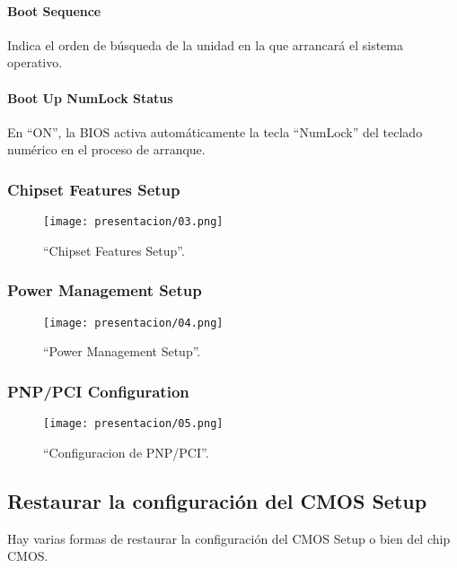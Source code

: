 \documentclass[12pt,oneside,a4paper]{article}
\begin{document}
			\paragraph{Boot Sequence}
			Indica el orden de búsqueda de la unidad en la que arrancará el
			sistema operativo.
			\paragraph{Boot Up NumLock Status}
			En ``ON'', la BIOS activa automáticamente la tecla ``NumLock'' del
			teclado numérico en el proceso de arranque.

		
		\subsubsection{Chipset Features Setup}{\label{sub:chipset features setup}}
			\begin{figure}[H]
				\centering
					\texttt{[image: presentacion/03.png]}
				\caption{``Chipset Features Setup''.}
			\end{figure}

		\subsubsection{Power Management Setup}{\label{sub:power management setup}}
			\begin{figure}[H]
				\centering
					\texttt{[image: presentacion/04.png]}
				\caption{``Power Management Setup''.}
			\end{figure}

		\subsubsection{PNP/PCI Configuration}{\label{sub:pnp/pci configuration}}
			\begin{figure}[H]
				\centering
					\texttt{[image: presentacion/05.png]}
				\caption{``Configuracion de PNP/PCI''.}
			\end{figure}

		\newpage

	\subsection{Restaurar la configuración del CMOS Setup}{\label{sec:cmossetup/resetear-el-cmos-setup}}

	Hay varias formas de restaurar la configuración del CMOS Setup o bien del chip CMOS.
\end{document}

